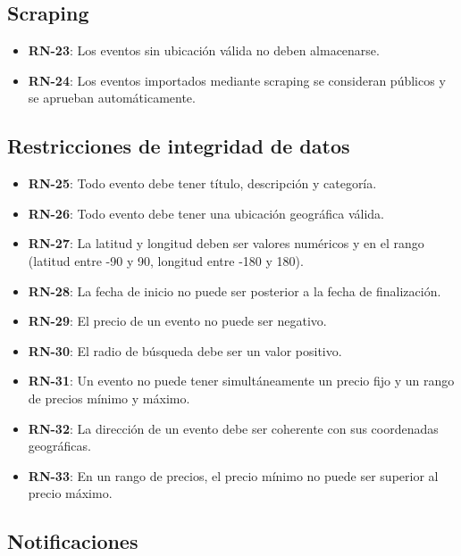 \subsection{Scraping}

\begin{itemize}
    \item \textbf{RN-23}: Los eventos sin ubicación válida no deben almacenarse.
    \item \textbf{RN-24}: Los eventos importados mediante scraping se consideran públicos y se aprueban automáticamente.

\end{itemize}

\subsection{Restricciones de integridad de datos}

\begin{itemize}
    \item \textbf{RN-25}: Todo evento debe tener título, descripción y categoría.
    \item \textbf{RN-26}: Todo evento debe tener una ubicación geográfica válida.
    \item \textbf{RN-27}: La latitud y longitud deben ser valores numéricos y en el rango (latitud entre -90 y 90, longitud entre -180 y 180).
    \item \textbf{RN-28}: La fecha de inicio no puede ser posterior a la fecha de finalización.
    \item \textbf{RN-29}: El precio de un evento no puede ser negativo.
    \item \textbf{RN-30}: El radio de búsqueda debe ser un valor positivo.
    \item \textbf{RN-31}: Un evento no puede tener simultáneamente un precio fijo y un rango de precios mínimo y máximo.
    \item \textbf{RN-32}: La dirección de un evento debe ser coherente con sus coordenadas geográficas.
    \item \textbf{RN-33}: En un rango de precios, el precio mínimo no puede ser superior al precio máximo.


\end{itemize}

\subsection{Notificaciones}

